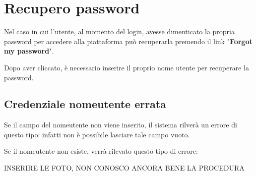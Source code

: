 \section{Recupero password} {
    Nel caso in cui l'utente, al momento del login, avesse dimenticato la propria password per accedere alla piattaforma 
    \platform può recuperarla premendo il link "\textbf{Forgot my password}". \aCapo

    Dopo aver cliccato, è necessario inserire il proprio nome utente per recuperare la password. 

    \subsection{Credenziale nomeutente errata} {
        Se il campo del nomeutente non viene inserito, il sistema rilverà un errore di questo tipo: infatti non è possibile lasciare 
        tale campo vuoto.

        Se il nomeutente non esiste, verrà rilevato questo tipo di errore: 

        INSERIRE LE FOTO, NON CONOSCO ANCORA BENE LA PROCEDURA
    }
}

